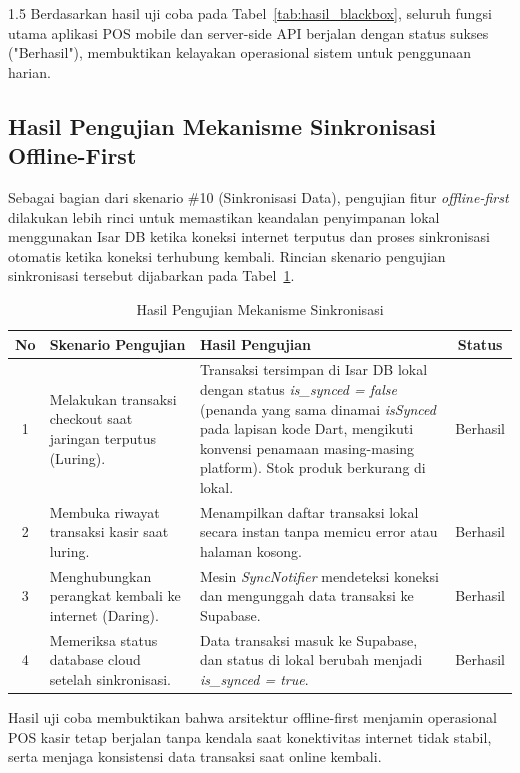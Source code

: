\documentclass[12pt, a4paper, onecolumn, oneside]{report}
\begin{document}
\begin{spacing}{1.5}
Berdasarkan hasil uji coba pada Tabel~\ref{tab:hasil_blackbox}, seluruh fungsi utama aplikasi POS mobile dan server-side API berjalan dengan status sukses ("Berhasil"), membuktikan kelayakan operasional sistem untuk penggunaan harian.

\subsection{Hasil Pengujian Mekanisme Sinkronisasi Offline-First}
Sebagai bagian dari skenario \#10 (Sinkronisasi Data), pengujian fitur \textit{offline-first} dilakukan lebih rinci untuk memastikan keandalan penyimpanan lokal menggunakan Isar DB ketika koneksi internet terputus dan proses sinkronisasi otomatis ketika koneksi terhubung kembali. Rincian skenario pengujian sinkronisasi tersebut dijabarkan pada Tabel~\ref{tab:hasil_sync}.

\begin{table}[H]
\centering
\caption{Hasil Pengujian Mekanisme Sinkronisasi}
\label{tab:hasil_sync}
\begin{tabularx}{\textwidth}{|c|X|X|c|}
\hline
\textbf{No} & \textbf{Skenario Pengujian} & \textbf{Hasil Pengujian} & \textbf{Status} \\
\hline
1 & Melakukan transaksi checkout saat jaringan terputus (Luring). & Transaksi tersimpan di Isar DB lokal dengan status \textit{is\_synced = false} (penanda yang sama dinamai \textit{isSynced} pada lapisan kode Dart, mengikuti konvensi penamaan masing-masing platform). Stok produk berkurang di lokal. & Berhasil \\
\hline
2 & Membuka riwayat transaksi kasir saat luring. & Menampilkan daftar transaksi lokal secara instan tanpa memicu error atau halaman kosong. & Berhasil \\
\hline
3 & Menghubungkan perangkat kembali ke internet (Daring). & Mesin \textit{SyncNotifier} mendeteksi koneksi dan mengunggah data transaksi ke Supabase. & Berhasil \\
\hline
4 & Memeriksa status database cloud setelah sinkronisasi. & Data transaksi masuk ke Supabase, dan status di lokal berubah menjadi \textit{is\_synced = true}. & Berhasil \\
\hline
\end{tabularx}
\end{table}

Hasil uji coba membuktikan bahwa arsitektur offline-first menjamin operasional POS kasir tetap berjalan tanpa kendala saat konektivitas internet tidak stabil, serta menjaga konsistensi data transaksi saat online kembali.


\end{spacing}
\end{document}

